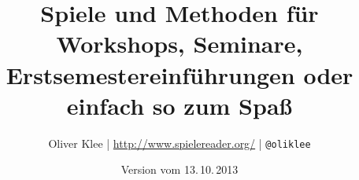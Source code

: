 \documentclass[a4paper,twoside,11pt,titlepage,openany]{scrbook}
\author{\raggedright Oliver Klee | \url{http://www.spielereader.org/} | \texttt{@oliklee}}
\title{Spiele und Methoden für Workshops, Seminare, Erstsemestereinführungen oder einfach so zum Spaß}
\date{Version vom 13.\,10.\,2013}
\begin{document}
\nocite*{}

\frontmatter
\maketitle
\tableofcontents

\mainmatter











\backmatter


\appendix




\printindex
\end{document}
